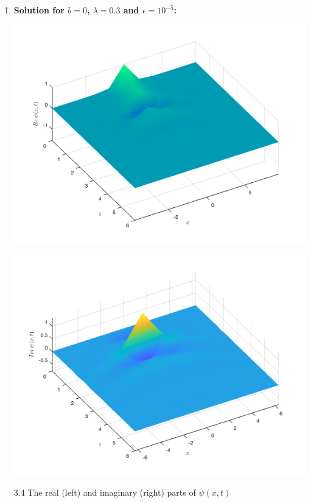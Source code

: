 \documentclass[12pt, letterpaper, twoside]{article}
\begin{document}
\begin{enumerate}[label=(\roman*)]
    \item \textbf{Solution for $b=0$, $\lambda=0.3$ and $\epsilon=10^{-5}$:}
   \begin{multicols}{2}
        \begin{center}
            \includegraphics[scale=0.35]{with friction/b0real.png}
        \end{center} 
        \begin{center}
            \includegraphics[scale=0.35]{with friction/b0imag.png}
        \end{center}  
    \end{multicols}
    \figurename{ 3.4 The real (left) and imaginary (right) parts of $\psi(x, t)$}
    \newpage
    

\end{enumerate}
\end{document}
